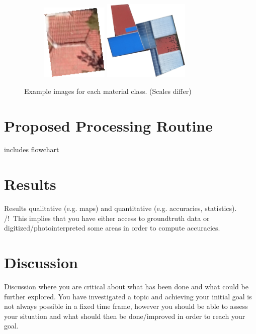 \documentclass[11pt]{article}
\begin{document}
\begin{figure}
\begin{subfigure}[c]{0.32\textwidth}
	\end{subfigure}
	\begin{subfigure}[c]{0.32\textwidth}
		\centering
		\includegraphics[width=0.35\textwidth]{figures/mat_examples/other1.png}		
		\includegraphics[width=0.45\textwidth]{figures/mat_examples/other2.png}
	\end{subfigure}
	\caption{Example images for each material class. (Scales differ)}
	\label{fig:mat_examples}
\end{figure}
	
	\section{Proposed Processing Routine}
	includes flowchart
	
	\section{Results}
	Results qualitative (e.g. maps) and quantitative (e.g. accuracies, statistics). /!\ This implies that you have either access to groundtruth data or digitized/photointerpreted some areas in order to compute accuracies.
	
	\section{Discussion}
	\label{sec:discussion}
	Discussion where you are critical about what has been done and what could be further explored. You have investigated a topic and achieving your initial goal is not always possible in a fixed time frame, however you should be able to assess your situation and what should then be done/improved in order to reach your goal.
	
\end{document}

